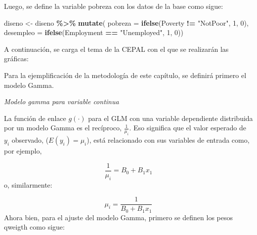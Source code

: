 \documentclass[
  spanish,
  12pt,
]{book}
\newenvironment{Shaded}{\begin{snugshade}}{\end{snugshade}}
\newcommand{\AttributeTok}[1]{\textcolor[rgb]{0.13,0.29,0.53}{#1}}
\newcommand{\DecValTok}[1]{\textcolor[rgb]{0.00,0.00,0.81}{#1}}
\newcommand{\FunctionTok}[1]{\textcolor[rgb]{0.13,0.29,0.53}{\textbf{#1}}}
\newcommand{\NormalTok}[1]{#1}
\newcommand{\OtherTok}[1]{\textcolor[rgb]{0.56,0.35,0.01}{#1}}
\newcommand{\SpecialCharTok}[1]{\textcolor[rgb]{0.81,0.36,0.00}{\textbf{#1}}}
\newcommand{\StringTok}[1]{\textcolor[rgb]{0.31,0.60,0.02}{#1}}
\begin{document}
Luego, se define la variable pobreza con los datos de la base como sigue:

\begin{Shaded}
\begin{Highlighting}[]
\NormalTok{diseno }\OtherTok{\textless{}{-}}\NormalTok{ diseno }\SpecialCharTok{\%\textgreater{}\%} 
  \FunctionTok{mutate}\NormalTok{(}
  \AttributeTok{pobreza =} \FunctionTok{ifelse}\NormalTok{(Poverty }\SpecialCharTok{!=} \StringTok{"NotPoor"}\NormalTok{, }\DecValTok{1}\NormalTok{, }\DecValTok{0}\NormalTok{),}
  \AttributeTok{desempleo =} \FunctionTok{ifelse}\NormalTok{(Employment }\SpecialCharTok{==} \StringTok{"Unemployed"}\NormalTok{, }\DecValTok{1}\NormalTok{, }\DecValTok{0}\NormalTok{))}
\end{Highlighting}
\end{Shaded}

A continuación, se carga el tema de la CEPAL con el que se realizarán las gráficas:

Para la ejemplificación de la metodología de este capítulo, se definirá primero el modelo Gamma.

\emph{Modelo gamma para variable continua}

La función de enlace \(g(\cdot)\) para el GLM con una variable dependiente distribuida por un modelo Gamma es el recíproco, \(\frac{1}{\mu_{i}}\). Eso significa que el valor esperado de \(y_i\) observado, (\(E(y_i) = \mu_i\)), está relacionado con sus variables de entrada como, por ejemplo,

\[
\frac{1}{\mu_{i}} = B_0 + B_1x_1
\]
o, similarmente:

\[
\mu_{i} = \frac{1}{B_0 + B_1x_1}
\]
Ahora bien, para el ajuste del modelo Gamma, primero se definen los pesos qweigth como sigue:

\begin{Shaded}
\end{Shaded}
\end{document}
